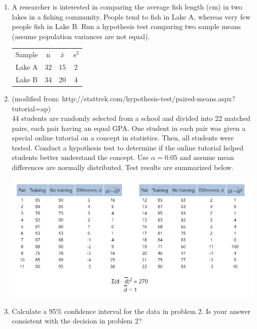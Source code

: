 \documentclass[12pt]{article}
\begin{document}
\begin{enumerate}
\item
A researcher is interested in comparing the average fish length (cm) in two lakes in a fishing community. People tend to fish in Lake A, whereas very few people fish in Lake B. Run a hypothesis test comparing two sample means (assume population variances are not equal). 

\begin{center}
\begin{tabular}{ |c|c|c|c| } 
 \hline
 Sample & n & $\bar{x}$ & $s^{2}$ \\ 
 Lake A & 32 & 15 & 2 \\ 
 Lake B & 34 & 20 & 4 \\ 
 \hline
\end{tabular}
\end{center}

\vspace{25 mm}

\item
(modified from: http://stattrek.com/hypothesis-test/paired-means.aspx?tutorial=ap) \\
44 students are randomly selected from a school and divided into 22 matched pairs, each pair having an equal GPA. One student in each pair was given a special online tutorial on a concept in statistics. Then, all students were tested. Conduct a hypothesis test to determine if the online tutorial helped students better understand the concept. Use $\alpha=0.05$ and assume mean differences are normally distributed. Test results are summarized below.
\begin{center}
\includegraphics[scale = 1.2]{samplepair}
\end{center}

\vspace{25mm}

\item
Calculate a 95\% confidence interval for the data in problem 2. Is your answer consistent with the decision in problem 2? \\

\vspace{25mm}

\end{enumerate}
\end{document}
